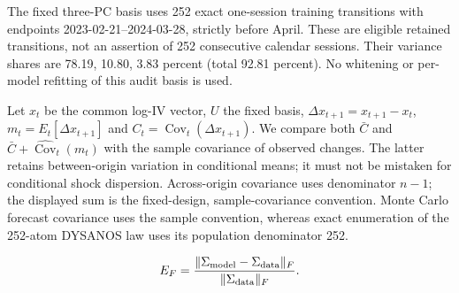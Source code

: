 \documentclass[11pt]{article}
\begin{document}
The fixed three-PC basis uses 252 exact one-session training transitions with endpoints 2023-02-21--2024-03-28, strictly before April. These are eligible retained transitions, not an assertion of 252 consecutive calendar sessions. Their variance shares are 78.19, 10.80, 3.83 percent (total 92.81 percent). No whitening or per-model refitting of this audit basis is used.

Let $x_t$ be the common log-IV vector, $U$ the fixed basis, $\Delta x_{t+1}=x_{t+1}-x_t$, $m_t=E_t[\Delta x_{t+1}]$ and $C_t=\operatorname{Cov}_t(\Delta x_{t+1})$. We compare both $\bar C$ and $\bar C+\widehat{\operatorname{Cov}}_t(m_t)$ with the sample covariance of observed changes. The latter retains between-origin variation in conditional means; it must not be mistaken for conditional shock dispersion. Across-origin covariance uses denominator $n-1$; the displayed sum is the fixed-design, sample-covariance convention. Monte Carlo forecast covariance uses the sample convention, whereas exact enumeration of the 252-atom DYSANOS law uses its population denominator 252.

\[E_F=\frac{\|\Sigma_{\rm model}-\Sigma_{\rm data}\|_F}{\|\Sigma_{\rm data}\|_F}.\]
\end{document}
